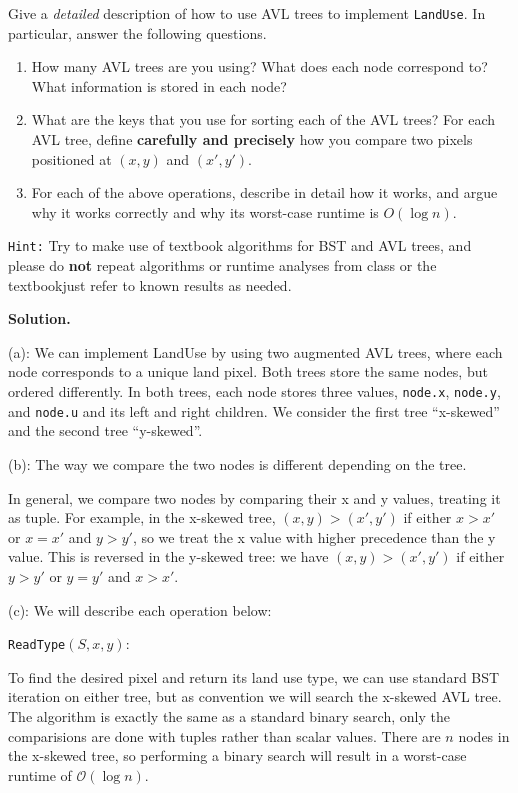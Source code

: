 \documentclass{assignment-263}
\begin{document}
\begin{enumerate}
		Give a \emph{detailed} description of how to use AVL trees to
		implement \texttt{LandUse}. In particular, answer the following
		questions.
		\begin{enumerate}
		\item	How many AVL trees are you using? What does each node
			correspond to? What information is stored in each node?
		\item	What are the keys that you use for sorting each of the AVL
			trees? For each AVL tree, define \textbf{carefully and
			precisely} how you compare two pixels positioned at $(x, y)$ and
			$(x', y')$.
		\item	For each of the above operations, describe in detail how
				it works, and argue why it works correctly and why its
				worst-case runtime is $O(\log n)$.
		\end{enumerate}
		\texttt{Hint:} Try to make use of textbook algorithms for BST and AVL
		trees, and please do \textbf{not} repeat algorithms or runtime
		analyses from class or the textbook\textemdash just refer to known results
		as needed. \hfill \break
\end{enumerate}

\textbf{Solution.}

(a): We can implement LandUse by using two augmented AVL trees, where each node corresponds to a unique land pixel. Both trees store the same nodes, but ordered differently. In both trees, each node stores three values, \verb|node.x|, \verb|node.y|, and \verb|node.u| and its left and right children. We consider the first tree ``x-skewed'' and the second tree ``y-skewed''.

(b): The way we compare the two nodes is different depending on the tree.

In general, we compare two nodes by comparing their x and y values, treating it as tuple. For example, in the x-skewed tree, \((x,y) > (x',y')\) if either \(x > x'\) or \(x = x'\) and \(y > y'\), so we treat the x value with higher precedence than the y value. This is reversed in the y-skewed tree: we have \((x,y) > (x',y')\) if either \(y > y'\) or \(y = y'\) and \(x > x'\).

(c): We will describe each operation below:

\texttt{ReadType}\((S,x,y)\):

To find the desired pixel and return its land use type, we can use standard BST iteration on either tree, but as convention we will search the x-skewed AVL tree. The algorithm is exactly the same as a standard binary search, only the comparisions are done with tuples rather than scalar values. There are \(n\) nodes in the x-skewed tree, so performing a binary search will result in a worst-case runtime of \(\mathcal{O} (\log n)\).
\end{document}
